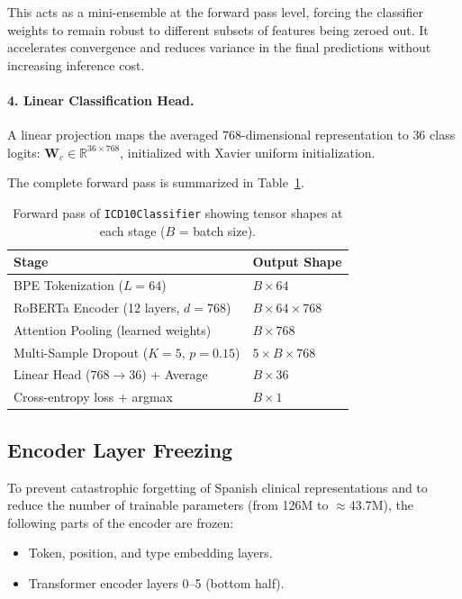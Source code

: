 \documentclass[10pt,a4paper,twocolumn]{article}
\begin{document}
This acts as a mini-ensemble at the forward pass level, forcing the classifier
weights to remain robust to different subsets of features being zeroed out. It
accelerates convergence and reduces variance in the final predictions without
increasing inference cost.

\paragraph{4. Linear Classification Head.}
A linear projection maps the averaged $768$-dimensional representation to $36$
class logits: $\mathbf{W}_c \in \mathbb{R}^{36 \times 768}$, initialized with
Xavier uniform initialization.

The complete forward pass is summarized in Table~\ref{tab:forward}.

\begin{table}[H]
\centering
\caption{Forward pass of \texttt{ICD10Classifier} showing tensor shapes at each stage
($B$ = batch size).}
\label{tab:forward}
\begin{tabular}{ll}
\toprule
\textbf{Stage} & \textbf{Output Shape} \\
\midrule
BPE Tokenization ($L=64$)                    & $B \times 64$ \\
RoBERTa Encoder (12 layers, $d=768$)         & $B \times 64 \times 768$ \\
Attention Pooling (learned weights)          & $B \times 768$ \\
Multi-Sample Dropout ($K=5$, $p=0.15$)      & $5 \times B \times 768$ \\
Linear Head ($768 \to 36$) + Average         & $B \times 36$ \\
Cross-entropy loss $+$ argmax                & $B \times 1$ \\
\bottomrule
\end{tabular}
\end{table}

\subsection{Encoder Layer Freezing}

To prevent catastrophic forgetting of Spanish clinical representations and to
reduce the number of trainable parameters (from 126M to $\approx$43.7M), the
following parts of the encoder are frozen:

\begin{itemize}
  \item Token, position, and type embedding layers.
  \item Transformer encoder layers 0--5 (bottom half).
\end{itemize}
\end{document}
